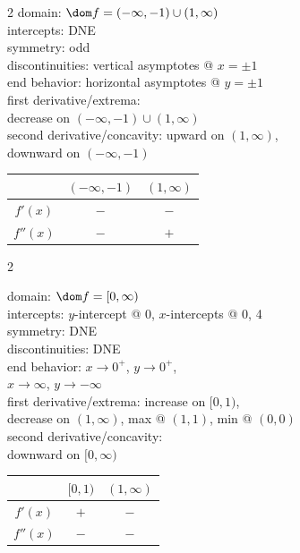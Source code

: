 \documentclass{book}
\begin{document}
\begin{appendices}
\begin{enumerate}[!HW!]
\begin{multicols}{2}
domain: $\dom f = (-\infty, -1)\cup (1,\infty)$ \\
intercepts: DNE\\
symmetry: odd \\ 
discontinuities: vertical asymptotes @ $x=\pm1$\\
end behavior: horizontal asymptotes @ $y=\pm1$\\
first derivative/extrema:\\ decrease on $(-\infty,-1)\cup(1,\infty)$\\
second derivative/concavity: upward on $(1,\infty)$,\\ downward on $(-\infty,-1)$\vspace{-15pt}
\begin{center}
\begin{tabular}{c|c|c}
 & $(-\infty, -1)$ &  $(1,\infty)$ \\ \hline
$f'(x)$ & $-$ & $-$ \\ 
$f''(x)$ & $-$ & $+$ \\ 
\end{tabular}
\end{center}
\end{multicols}

\itemspade \mbox{}\vspace{-25pt}

\begin{multicols}{2}
\columnbreak
 
domain: $\dom f = [0,\infty)$ \\
intercepts: $y$-intercept @ 0, $x$-intercepts @ 0, 4\\
symmetry: DNE \\ 
discontinuities: DNE\\
end behavior: $x\to0^+$, $y\to 0^+$, \\ $x\to \infty$, $y\to-\infty$\\
first derivative/extrema: increase on $[0,1)$,\\ decrease on $(1,\infty)$, max @ $(1,1)$, min @ $(0,0)$\\
second derivative/concavity:\\ downward on $[0,\infty)$
\begin{center}
\begin{tabular}{c|c|c}
 & $[0, 1)$ &  $(1,\infty)$ \\ \hline
$f'(x)$ & $+$ & $-$ \\ 
$f''(x)$ & $-$ & $-$ \\ 
\end{tabular}
\end{center}
\end{multicols}\pagebreak


\end{enumerate}
\end{appendices}
\end{document}
